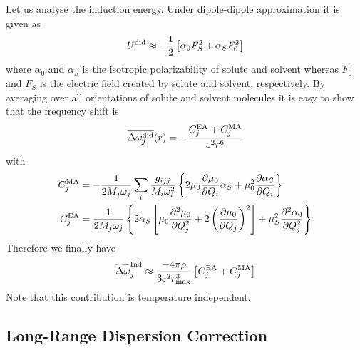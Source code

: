 \documentclass[b5paper,oneside,fleqn,11pt]{book}
\newcommand{\fderiv}[2]{\ensuremath{
    \frac{\partial #1}{\partial #2}}}
\newcommand{\sderiv}[2]{\ensuremath{
    \frac{\partial^2 #1}{\partial #2^2}
    }}
\begin{document}
\begin{refsection}
Let us analyse the induction energy. Under dipole\hyp{}dipole
approximation it is given as
%
\begin{equation}
 U^{\rm did} \approx -\frac{1}{2} \left[ \alpha_0 F_S^2 + \alpha_S F_0^2\right]
\end{equation}
%
where $\alpha_0$ and $\alpha_S$ is the isotropic polarizability
of solute and solvent whereas $F_0$ and $F_S$ is the electric field
created by solute and solvent, respectively.
By averaging over all orientations of solute and solvent
molecules it is easy to show that
the frequency shift is
%
\begin{equation}
 \overline{\Delta \omega_j^{\rm did}}(r) = 
-\frac{C_j^{\rm EA} + C_j^{\rm MA} }{\varepsilon^2 r^6}
\end{equation}
%
with
%
\begin{subequations}
\begin{align}
  C_j^{\rm MA} &= -\frac{1}{2M_j\omega_j}\sum_i \frac{g_{ijj}}{M_i\omega_i^2} \left\{ 
   2\mu_0\fderiv{\mu_0}{Q_i}\alpha_S + \mu_0^2\fderiv{\alpha_S}{Q_i}
\right\} \\
  C_j^{\rm EA} &= \frac{1}{2M_j\omega_j} \left\{ 
  2\alpha_S\left[
      \mu_0\sderiv{\mu_0}{Q_j} + 2\left(\fderiv{\mu_0}{Q_j}\right)^2 
    \right]
   + \mu_S^2 \sderiv{\alpha_0}{Q_j}
\right\}
\end{align}
\end{subequations}
%
Therefore we finally have
%
\begin{equation} \label{e:x12341}
 \widetilde{\Delta \omega}_j^{\rm Ind} \approx
\frac{-4\pi\rho}{3\varepsilon^2 r_{\max}^3} \left[ C_j^{\rm EA} + C_j^{\rm MA} \right]
\end{equation}
%
Note that this contribution is temperature independent.

\subsection{Long\hyp{}Range Dispersion Correction}


\end{refsection}
\end{document}
